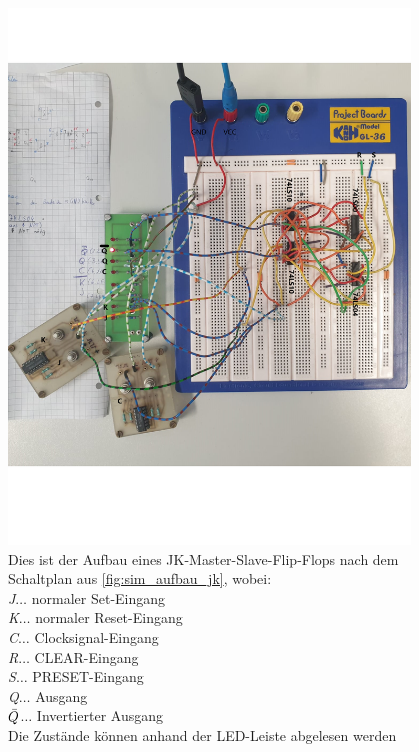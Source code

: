 \documentclass[12pt,english,ngerman]{scrartcl}
\begin{document}
\begin{figure}[H]
  \centering
    \includegraphics[width=0.95\textwidth]{./figures/messungen/jk/aufbau.png}
  \caption{Dies ist der Aufbau eines JK-Master-Slave-Flip-Flops nach dem
  Schaltplan aus \autoref{fig:sim_aufbau_jk}, wobei:\\
    \textit{J}$\dots$ normaler Set-Eingang\\
    \textit{K}$\dots$ normaler Reset-Eingang\\
    \textit{C}$\dots$ Clocksignal-Eingang\\
    \textit{R}$\dots$ CLEAR-Eingang\\
    \textit{S}$\dots$ PRESET-Eingang\\
    \textit{Q}$\dots$ Ausgang\\
    \textit{$\Bar{Q}$}$\dots$ Invertierter Ausgang\\
    Die Zustände können anhand der LED-Leiste abgelesen werden}
  \label{fig:mess_aufbau_jk}
\end{figure}
\end{document}
